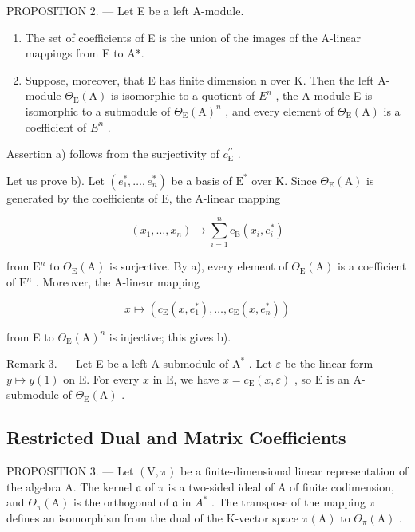 PROPOSITION 2. --- Let E be a left A-module.

\begin{enumerate}
\def\labelenumi{\alph{enumi})}
\item
  The set of coefficients of E is the union of the images of the A-linear mappings from E to A*.
\item
  Suppose, moreover, that E has finite dimension n over K. Then the left A-module \(\Theta_{\mathrm{E}}(\mathrm{A})\) is isomorphic to a quotient of \(E^{n}\) , the A-module E is isomorphic to a submodule of \(\Theta_{\mathrm{E}}(\mathrm{A})^{n}\) , and every element of \(\Theta_{\mathrm{E}}(\mathrm{A})\) is a coefficient of \(E^{n}\) .
\end{enumerate}

Assertion a) follows from the surjectivity of \(c_{\mathrm{E}}^{\prime \prime}\) .

Let us prove b). Let \((e_1^*,\ldots ,e_n^*)\) be a basis of \(\mathrm{E}^*\) over K. Since \(\Theta_{\mathrm{E}}(\mathrm{A})\) is generated by the coefficients of E, the A-linear mapping

\[
(x _ {1}, \ldots , x _ {n}) \mapsto \sum_ {i = 1} ^ {n} c _ {\mathrm{E}} (x _ {i}, e _ {i} ^ {*})
\]

from \(\mathrm{E}^n\) to \(\Theta_{\mathrm{E}}(\mathrm{A})\) is surjective. By a), every element of \(\Theta_{\mathrm{E}}(\mathrm{A})\) is a coefficient of \(\mathrm{E}^n\) . Moreover, the A-linear mapping

\[
x \mapsto \left(c _ {\mathrm{E}} (x, e _ {1} ^ {*}), \ldots , c _ {\mathrm{E}} (x, e _ {n} ^ {*})\right)
\]

from E to \(\Theta_{\mathrm{E}}(\mathrm{A})^{n}\) is injective; this gives b).

Remark 3. --- Let E be a left A-submodule of \(\mathrm{A}^*\) . Let \(\varepsilon\) be the linear form \(y \mapsto y(1)\) on E. For every \(x\) in E, we have \(x = c_{\mathrm{E}}(x, \varepsilon)\) , so E is an A-submodule of \(\Theta_{\mathrm{E}}(\mathrm{A})\) .

\subsection{Restricted Dual and Matrix Coefficients}

PROPOSITION 3. --- Let \((\mathrm{V},\pi)\) be a finite-dimensional linear representation of the algebra A. The kernel \(\mathfrak{a}\) of \(\pi\) is a two-sided ideal of A of finite codimension, and \(\Theta_{\pi}(\mathrm{A})\) is the orthogonal of \(\mathfrak{a}\) in \(A^{*}\) . The transpose of the mapping \(\pi\) defines an isomorphism from the dual of the K-vector space \(\pi(\mathrm{A})\) to \(\Theta_{\pi}(\mathrm{A})\) .

